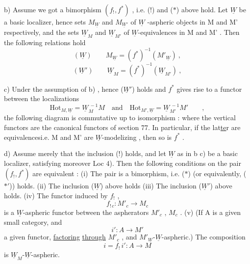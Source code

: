 
b) Assume we got a bimorphism $(f_!,f^*)$ , i.e. (!) and ($*$) above
hold. Let $\underline{W}$ be a basic localizer, hence  sets $M_{\underline{W}}$ and $M_{\underline{W}'}$ of 
$\underline{W}$ -aspheric objects in M and M' respectively, and the sets $\underline{W}_M$ and $\underline{W}_{M'}$
of $\underline{W}$-equivalences in M and M' . Then the following relations hold
\[ (\underline{W}) \qquad M_{\underline{W}} = (f^*)^{-1}(M'_{\underline{W}}) \ , \]
\[ (\underline{W}') \qquad \underline{W}_M = (f^*)^{-1}(\underline{W}_{M'}) \ , \]

c) Under the assumption of b) , hence ($\underline{W}'$) holds and $f^*$ gives
rise to a functor  between the localizations 
\[ \mathrm{Hot}_{M,\underline{W}} = \underline{W}_M^{\ -1}M \quad\text{and}\quad \mathrm{Hot}_{M',\underline{W}} = \underline{W}_{M'}^{\ -1}M' \qquad , \]
the following diagram is commutative up to  isomorphism :
where the vertical functors are the canonical functors of section 77.
In particular, if the lat\uline{te}r are equivalences\hand{(}i.e. M and M' are
$\underline{W}$-modelizing\hand{)} , then so is $f^*$ .

d) Assume merely that the inclusion (!) holds, and let $\underline{W}$ as in b\hand{)}
c) be a basic localizer, satisfying moreover Loc 4). Then the 
 following conditions on the pair $(f_!,f^*)$ are equivalent :
(i) The pair is a bimorphism, i.e. ($*$) (or equivalently, ($*'$))
holds.
(ii) The inclusion  ($\underline{W}$) above holds\unsure{,} 
(iii) The inclusion  ($\underline{W}'$) above holds.
(iv) The functor induced by $f_!$ ,
\[ f_{!\,c} : M'_c \to M_c \]
is a $\underline{W}$-aspheric functor between the aspherators $M'_c$ , $M_c$ .
(v) (If A is a given small category, and 
\[ i' : A \to M' \]
a given functor, \uline{factoring} \uline{through} $M'_c$ , and $M'_{\underline{W}}$-$\underline{W}$-aspheric.) The
composition
\[ i = f_!\, i' : A \to M \]
is $\underline{W}_M$-$\underline{W}$-aspheric.


